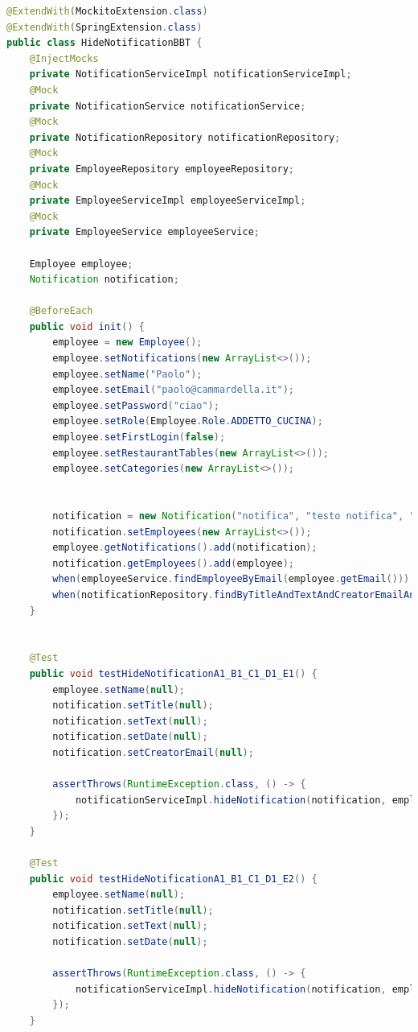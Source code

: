 \newpage
\begin{lstlisting}[language=java]
@ExtendWith(MockitoExtension.class)
@ExtendWith(SpringExtension.class)
public class HideNotificationBBT {
    @InjectMocks
    private NotificationServiceImpl notificationServiceImpl;
    @Mock
    private NotificationService notificationService;
    @Mock
    private NotificationRepository notificationRepository;
    @Mock
    private EmployeeRepository employeeRepository;
    @Mock
    private EmployeeServiceImpl employeeServiceImpl;
    @Mock
    private EmployeeService employeeService;

    Employee employee;
    Notification notification;

    @BeforeEach
    public void init() {
        employee = new Employee();
        employee.setNotifications(new ArrayList<>());
        employee.setName("Paolo");
        employee.setEmail("paolo@cammardella.it");
        employee.setPassword("ciao");
        employee.setRole(Employee.Role.ADDETTO_CUCINA);
        employee.setFirstLogin(false);
        employee.setRestaurantTables(new ArrayList<>());
        employee.setCategories(new ArrayList<>());


        notification = new Notification("notifica", "testo notifica", "12/03/1999", "paolo@cammardella.it");
        notification.setEmployees(new ArrayList<>());
        employee.getNotifications().add(notification);
        notification.getEmployees().add(employee);
        when(employeeService.findEmployeeByEmail(employee.getEmail())).thenReturn(employee);
        when(notificationRepository.findByTitleAndTextAndCreatorEmailAndDate(notification.getTitle(), notification.getText(), notification.getCreatorEmail(), notification.getDate())).thenReturn(notification);
    }


    @Test
    public void testHideNotificationA1_B1_C1_D1_E1() {
        employee.setName(null);
        notification.setTitle(null);
        notification.setText(null);
        notification.setDate(null);
        notification.setCreatorEmail(null);

        assertThrows(RuntimeException.class, () -> {
            notificationServiceImpl.hideNotification(notification, employee);
        });
    }

    @Test
    public void testHideNotificationA1_B1_C1_D1_E2() {
        employee.setName(null);
        notification.setTitle(null);
        notification.setText(null);
        notification.setDate(null);

        assertThrows(RuntimeException.class, () -> {
            notificationServiceImpl.hideNotification(notification, employee);
        });
    }


\end{lstlisting}

